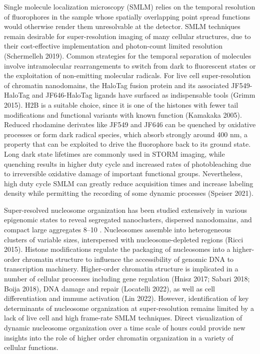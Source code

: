 \documentclass{ucetd}
\begin{document}
Single molecule localization microscopy (SMLM) relies on the temporal resolution of fluorophores in the sample whose spatially overlapping point spread functions would otherwise render them unresolvable at the detector. SMLM techniques remain desirable for super-resolution imaging of many cellular structures, due to their cost-effective implementation and photon-count limited resolution (Schermelleh 2019). Common strategies for the temporal separation of molecules involve intramolecular rearrangements to switch from dark to fluorescent states or the exploitation of non-emitting molecular radicals. For live cell super-resolution of chromatin nanodomains, the HaloTag fusion protein and its associated JF549-HaloTag and JF646-HaloTag ligands have surfaced as indispensable tools (Grimm 2015). H2B is a suitable choice, since it is one of the histones with fewer tail modifications and functional variants with known function (Kamakaka 2005). Reduced rhodamine derivates like JF549 and JF646 can be quenched by oxidative processes or form dark radical species, which absorb strongly around 400 nm, a property that can be exploited to drive the fluorophore back to its ground state. Long dark state lifetimes are commonly used in STORM imaging, while quenching results in higher duty cycle and increased rates of photobleaching due to irreversible oxidative damage of important functional groups. Nevertheless, high duty cycle SMLM can greatly reduce acquisition times and increase labeling density while permitting the recording of some dynamic processes (Speiser 2021).  

Super-resolved nucleosome organization has been studied extensively in various epigenomic states to reveal segregated nanoclusters, dispersed nanodomains, and compact large aggregates  8–10 . Nucleosomes assemble into heterogeneous clusters of variable sizes, interspersed with nucleosome-depleted regions (Ricci 2015). Histone modiﬁcations regulate the packaging of nucleosomes into a higher-order chromatin structure to inﬂuence the accessibility of genomic DNA to transcription machinery. Higher-order chromatin structure is implicated in a number of cellular processes including gene regulation (Hnisz 2017; Sabari 2018; Boija 2018), DNA damage and repair (Locatelli 2022), as well as cell differentiation and immune activation (Lin 2022). However, identification of key determinants of nucleosome organization at super-resolution remains limited by a lack of live cell and high frame-rate SMLM techniques. Direct visualization of dynamic nucleosome organization over a time scale of hours could provide new insights into the role of higher order chromatin organization in a variety of cellular functions.  
\end{document}
